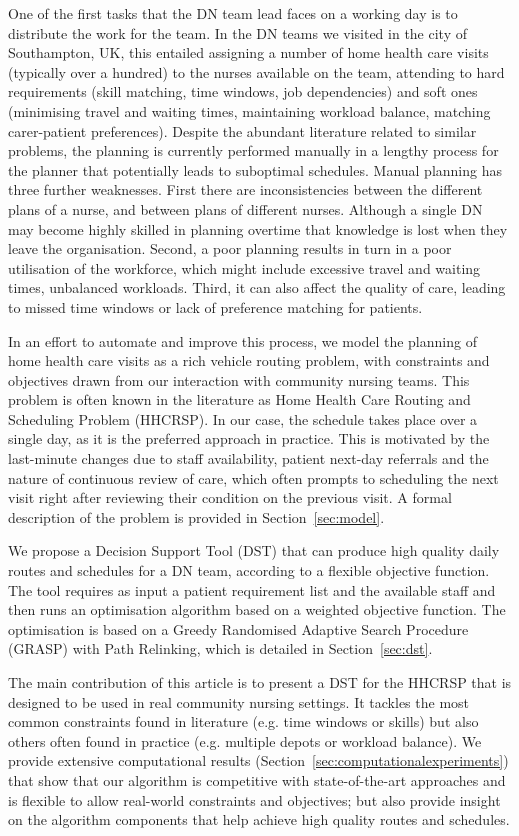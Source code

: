 \documentclass[a4paper,11pt,authoryear]{elsarticle}
\begin{document}
One of the first tasks that the DN team lead faces on a working day is to distribute the work for the team. In the DN teams we visited in the city of Southampton, UK, this entailed assigning a number of home health care visits (typically over a hundred) to the nurses available on the team, attending to hard requirements (skill matching, time windows, job dependencies) and soft ones (minimising travel and waiting times, maintaining workload balance, matching carer-patient preferences). Despite the abundant literature related to similar problems, the planning is currently performed manually in a lengthy process for the planner that potentially leads to suboptimal schedules. Manual planning has three further weaknesses. First there are inconsistencies between the different plans of a nurse, and between plans of different nurses. Although a single DN may become highly skilled in planning overtime that knowledge is lost when they leave the organisation. Second, a poor planning results in turn in a poor utilisation of the workforce, which might include excessive travel and waiting times, unbalanced workloads. Third, it can also affect the quality of care, leading to missed time windows or lack of preference matching for patients.

In an effort to automate and improve this process, we model the planning of home health care visits as a rich vehicle routing problem, with constraints and objectives drawn from our interaction with community nursing teams. This problem is often known in the literature as Home Health Care Routing and Scheduling Problem (HHCRSP). In our case, the schedule takes place over a single day, as it is the preferred approach in practice. This is motivated by the last-minute changes due to staff availability, patient next-day referrals and the nature of continuous review of care, which often prompts to scheduling the next visit right after reviewing their condition on the previous visit. A formal description of the problem is provided in Section~\ref{sec:model}.

We propose a Decision Support Tool (DST) that can produce high quality daily routes and schedules for a DN team, according to a flexible objective function. The tool requires as input a patient requirement list and the available staff and then runs an optimisation algorithm based on a weighted objective function. The optimisation is based on a Greedy Randomised Adaptive Search Procedure (GRASP) with Path Relinking, which is detailed in Section~\ref{sec:dst}.

The main contribution of this article is to present a DST for the HHCRSP that is designed to be used in real community nursing settings. It tackles the most common constraints found in literature (e.g. time windows or skills) but also others often found in practice (e.g. multiple depots or workload balance). We provide extensive computational results (Section~\ref{sec:computationalexperiments}) that show that our algorithm is competitive with state-of-the-art approaches and is flexible to allow real-world constraints and objectives; but also provide insight on the algorithm components that help achieve high quality routes and schedules. 
\end{document}
